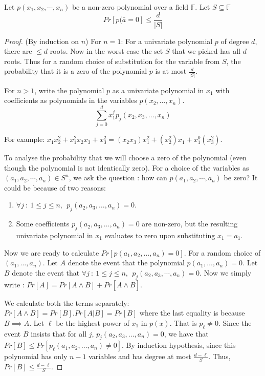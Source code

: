 \begin{lemma}
Let $p(x_1, x_2, \cdots , x_n)$ be a non-zero polynomial over a field
$\mathbb{F}$. Let $S\subseteq \mathbb{F}$
$$Pr[p(\bar{a}=0]\leq \frac{d}{|S|}$$
\end{lemma}
\begin{proof}
(By induction on $n$) For $n=1$: For a univariate polynomial $p$ of
  degree $d$, there are $\leq d$ roots. Now in the worst case the set
  $S$ that we picked has all $d$ roots. Thus for a random choice of
  substitution for the variable from $S$, the probability that it is a zero of
  the polynomial $p$ is at most $\frac{d}{|S|}$.

For $n>1$, write the polynomial $p$ as a univariate polynomial in $x_1$ with coefficients as polynomials in the variables $p(x_2, \ldots, x_n)$.
$$ \displaystyle \sum_{j=0}^{d}x_1^jp_j(x_2, x_3, \ldots, x_n)$$

For example: $x_1x_2^2+x_1^2x_2x_3+x_3^2=(x_2x_3)x_1^2+(x_2^2)x_1+x_1^0(x_3^2)$.

To analyse the probability that we will choose a zero of the
polynomial (even though the polynomial is not identically zero). For a
choice of the variables as $(a_1, a_2, \cdots, a_n)\in S^n$, we ask
the question : how can $p(a_1, a_2, \cdots, a_n)$ be zero? It could be
because of two reasons:

\begin{enumerate}
\item $\forall j~:~1 \le j \le n , ~~ p_j(a_2, a_3, \ldots , a_n)=0$.
\item %
Some coefficients $p_j(a_2, a_3, \ldots , a_n)=0$ are non-zero, but
the resulting univariate polynomial in $x_1$ evaluates to zero upon
substituting $x_1 = a_1$.
\end{enumerate}

Now we are ready to calculate $Pr [ p(a_1, a_2, \ldots, a_n) = 0 ]$.
For a random choice of $(a_1, \ldots, a_n)$.
Let $A$ denote the event that the polynomial $p(a_1, \ldots, a_n) = 0$.
Let $B$ denote the event that $\forall j~:~1 \le j \le n ,~~p_j(a_2, a_3, \cdots , a_n)=0$.
Now we simply write : $Pr[A] = Pr[A \land B]+Pr[A\land \bar{B}]$.

We calculate both the terms separately: $Pr[A \land B] = Pr[B].Pr[A|B]
= Pr[B]$ where the last equality is because $B \implies A$.  Let
$\ell$ be the highest power of $x_1$ in $p(x)$. That is $p_\ell \ne
0$. Since the event $B$ insists that for all $j$, $p_j(a_2, a_3,
\ldots , a_n)=0$, we have that $Pr[B] \leq Pr[p_\ell(a_1, a_2, \ldots,
  a_n) \ne 0]$.  By induction hypothesis, since this polynomial has
only $n-1$ variables and has degree at most $\frac{d -
  \ell}{S}$. Thus, $Pr[B] \le \frac{d - \ell}{S}$.


\end{proof}
